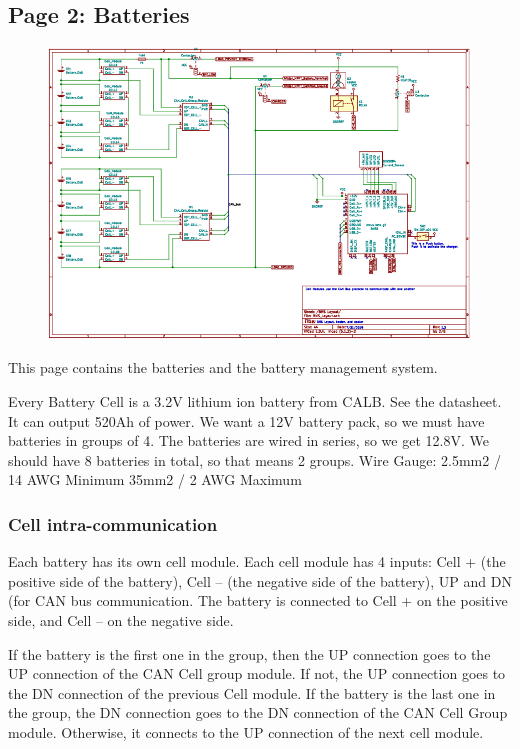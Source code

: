 \subsection{Page 2: Batteries}

\begin{figure}
	\includegraphics{./graphics/schematic/sch_page_2.png}
\end{figure}

This page contains the batteries and the battery management system.

Every Battery Cell is a 3.2V lithium ion battery from CALB. See the datasheet. It can output 520Ah of power. We want a 12V battery pack, so we must have batteries in groups of 4. The batteries are wired in series, so we get 12.8V. We should have 8 batteries in total, so that means 2 groups.
\newline
Wire Gauge: 
2.5mm2 / 14 AWG Minimum
35mm2 / 2 AWG Maximum 

\subsubsection{Cell intra-communication}
Each battery has its own cell module. Each cell module has 4 inputs: Cell + (the positive side of the battery), Cell – (the negative side of the battery), UP and DN (for CAN bus communication. The battery is connected to Cell + on the positive side, and Cell – on the negative side. 

If the battery is the first one in the group, then the UP connection goes to the UP connection of the CAN Cell group module. If not, the UP connection goes to the DN connection of the previous Cell module. If the battery is the last one in the group, the DN connection goes to the DN connection of the CAN Cell Group module. Otherwise, it connects to the UP connection of the next cell module.

